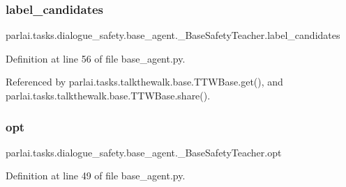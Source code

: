 \subsubsection{\texorpdfstring{label\+\_\+candidates}{label\_candidates}}
{\footnotesize\ttfamily parlai.\+tasks.\+dialogue\+\_\+safety.\+base\+\_\+agent.\+\_\+\+Base\+Safety\+Teacher.\+label\+\_\+candidates}



Definition at line 56 of file base\+\_\+agent.\+py.



Referenced by parlai.\+tasks.\+talkthewalk.\+base.\+T\+T\+W\+Base.\+get(), and parlai.\+tasks.\+talkthewalk.\+base.\+T\+T\+W\+Base.\+share().

\mbox{\label{classparlai_1_1tasks_1_1dialogue__safety_1_1base__agent_1_1__BaseSafetyTeacher_a72d5420bf860ece2469f704aff6a4741}} 
\subsubsection{\texorpdfstring{opt}{opt}}
{\footnotesize\ttfamily parlai.\+tasks.\+dialogue\+\_\+safety.\+base\+\_\+agent.\+\_\+\+Base\+Safety\+Teacher.\+opt}



Definition at line 49 of file base\+\_\+agent.\+py.



